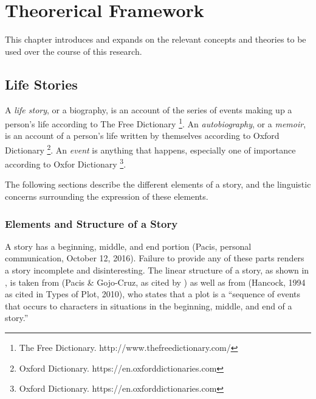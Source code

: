 %
%
%                 


\chapter{Theorerical Framework}
\label{sec:theoreticalframewrok}

This chapter introduces and expands on the relevant concepts and theories to be used over the course of this research.

\section{Life Stories}
A \textit{life story}, or a biography, is an account of the series of events making up a person's life according to The Free Dictionary \footnote{The Free Dictionary. http://www.thefreedictionary.com/}. An \textit{autobiography}, or a \textit{memoir}, is an account of a person's life written by themselves according to Oxford Dictionary \footnote{Oxford Dictionary. https://en.oxforddictionaries.com}. An \textit{event} is anything that happens, especially one of importance according to Oxfor Dictionary \footnote{Oxford Dictionary. https://en.oxforddictionaries.com}.

The following sections describe the different elements of a story, and the linguistic concerns surrounding the expression of these elements. 

\subsection{Elements and Structure of a Story}
A story has a beginning, middle, and end portion (Pacis, personal communication, October 12, 2016). Failure to provide any of these parts renders a story incomplete and disinteresting. The linear structure of a story, as shown in , is taken from (Pacis \& Gojo-Cruz, as cited by \cite{Chua2016}) as well as from (Hancock, 1994 as cited in Types of Plot, 2010), who states that a plot is a ``sequence of events that occurs to characters in situations in the beginning, middle, and end of a story.''

